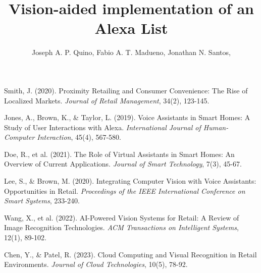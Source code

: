 \documentclass[12pt]{article}
\title{Vision-aided implementation of an Alexa List}
\author{
  Joseph A. P. Quino\inst{1},
  Fabio A. T. Madueno\inst{1},
  Jonathan N. Santos\inst{1},
}
\begin{document}
\lstset{
    basicstyle=\ttfamily\footnotesize,  %
    breaklines=true,                    %
    frame=single,                       %
    captionpos=b,                       %
    xleftmargin=2em,                    %
    framexleftmargin=1.5em              %
}


\maketitle








% 

\begin{thebibliography}{}

Smith, J. (2020). Proximity Retailing and Consumer Convenience: The Rise of Localized Markets. \textit{Journal of Retail Management}, 34(2), 123-145.

Jones, A., Brown, K., \& Taylor, L. (2019). Voice Assistants in Smart Homes: A Study of User Interactions with Alexa. \textit{International Journal of Human-Computer Interaction}, 45(4), 567-580.

Doe, R., et al. (2021). The Role of Virtual Assistants in Smart Homes: An Overview of Current Applications. \textit{Journal of Smart Technology}, 7(3), 45-67.

Lee, S., \& Brown, M. (2020). Integrating Computer Vision with Voice Assistants: Opportunities in Retail. \textit{Proceedings of the IEEE International Conference on Smart Systems}, 233-240.

Wang, X., et al. (2022). AI-Powered Vision Systems for Retail: A Review of Image Recognition Technologies. \textit{ACM Transactions on Intelligent Systems}, 12(1), 89-102.

Chen, Y., \& Patel, R. (2023). Cloud Computing and Visual Recognition in Retail Environments. \textit{Journal of Cloud Technologies}, 10(5), 78-92.

\end{thebibliography}

\appendix
\end{document}
